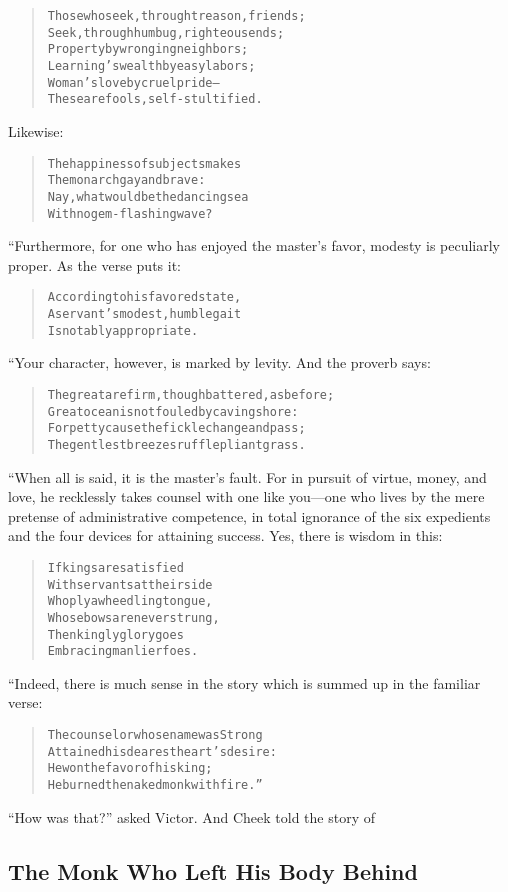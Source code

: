 \documentclass[article, twoside, 14pt]{memoir}
\renewenvironment{verbatim}{%
\begin{quote}%
\vskip -10pt%
\begin{alltt}\normalfont\large}{\end{alltt}%
\end{quote}%
\vskip -10pt
} %
\begin{document}
\begin{verbatim}
Those who seek, through treason, friends;
Seek, through humbug, righteous ends;
Property by wronging neighbors;
Learning's wealth by easy labors;
Woman's love by cruel pride--
These are fools, self-stultified.
\end{verbatim}
Likewise:

\begin{verbatim}
The happiness of subjects makes
    The monarch gay and brave:
Nay, what would be the dancing sea
    With no gem-flashing wave?
\end{verbatim}
“Furthermore, for one who has enjoyed the master's favor, modesty
is peculiarly proper. As the verse puts it:

\begin{verbatim}
According to his favored state,
A servant's modest, humble gait
Is notably appropriate.
\end{verbatim}
“Your character, however, is marked by levity. And the proverb
says:

\begin{verbatim}
The great are firm, though battered, as before;
Great ocean is not fouled by caving shore:
For petty cause the fickle change and pass;
The gentlest breezes ruffle pliant grass.
\end{verbatim}
“When all is said, it is the master's fault. For in pursuit of
virtue, money, and love, he recklessly takes counsel with one like
you---one who lives by the mere pretense of administrative
competence, in total ignorance of the six expedients and the four
devices for attaining success. Yes, there is wisdom in this:

\begin{verbatim}
If kings are satisfied
With servants at their side
Who ply a wheedling tongue,
Whose bows are never strung,
Then kingly glory goes
Embracing manlier foes.
\end{verbatim}
“Indeed, there is much sense in the story which is summed up in the
familiar verse:

\begin{verbatim}
The counselor whose name was Strong
    Attained his dearest heart's desire:
He won the favor of his king;
    He burned the naked monk with fire.”
\end{verbatim}
``How was that?'' asked Victor. And Cheek told the story of

\subsection{The Monk Who Left His Body Behind}
\end{document}
